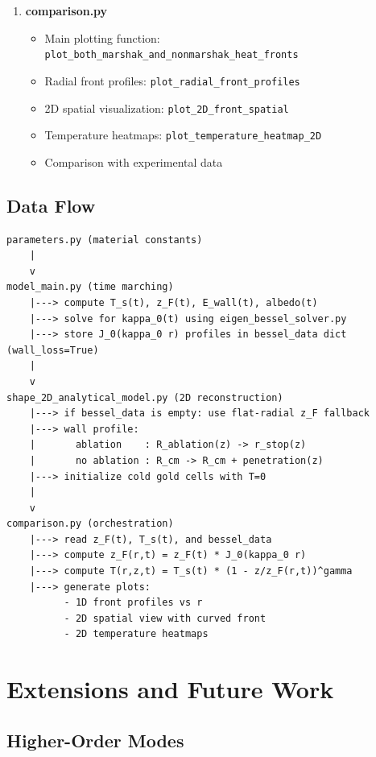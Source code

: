 \documentclass[12pt,a4paper]{article}
\begin{document}
\begin{enumerate}
    \item \textbf{comparison.py}
    \begin{itemize}
        \item Main plotting function: \texttt{plot\_both\_marshak\_and\_nonmarshak\_heat\_fronts}
        \item Radial front profiles: \texttt{plot\_radial\_front\_profiles}
        \item 2D spatial visualization: \texttt{plot\_2D\_front\_spatial}
        \item Temperature heatmaps: \texttt{plot\_temperature\_heatmap\_2D}
        \item Comparison with experimental data
    \end{itemize}
\end{enumerate}

\subsection{Data Flow}

\begin{verbatim}
parameters.py (material constants)
    |
    v
model_main.py (time marching)
    |---> compute T_s(t), z_F(t), E_wall(t), albedo(t)
    |---> solve for kappa_0(t) using eigen_bessel_solver.py
    |---> store J_0(kappa_0 r) profiles in bessel_data dict (wall_loss=True)
    |
    v
shape_2D_analytical_model.py (2D reconstruction)
    |---> if bessel_data is empty: use flat-radial z_F fallback
    |---> wall profile:
    |       ablation    : R_ablation(z) -> r_stop(z)
    |       no ablation : R_cm -> R_cm + penetration(z)
    |---> initialize cold gold cells with T=0
    |
    v
comparison.py (orchestration)
    |---> read z_F(t), T_s(t), and bessel_data
    |---> compute z_F(r,t) = z_F(t) * J_0(kappa_0 r)
    |---> compute T(r,z,t) = T_s(t) * (1 - z/z_F(r,t))^gamma
    |---> generate plots:
          - 1D front profiles vs r
          - 2D spatial view with curved front
          - 2D temperature heatmaps
\end{verbatim}

\section{Extensions and Future Work}

\subsection{Higher-Order Modes}
\end{document}
